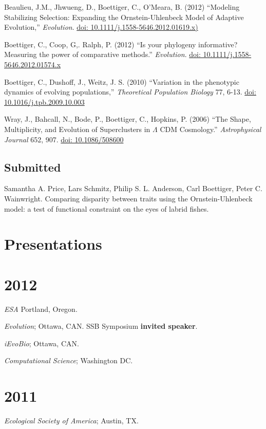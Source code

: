\documentclass[margin]{res}
\begin{document}
\begin{resume}
Beaulieu, J.M., Jhwueng, D., Boettiger, C., O'Meara, B. (2012) ``Modeling Stabilizing Selection: Expanding the Ornstein-Uhlenbeck Model of Adaptive Evolution,'' {\it Evolution}. \href{http://dx.doi.org/10.1111/j.1558-5646.2012.01619.x}{doi: 10.1111/j.1558-5646.2012.01619.x)}

Boettiger, C., Coop, G,. Ralph, P. (2012) ``Is your phylogeny informative? Measuring the power of comparative methods.'' {\it Evolution}. \href{http://dx.doi.org/10.1111/j.1558-5646.2012.01574.x}{doi: 10.1111/j.1558-5646.2012.01574.x}

Boettiger, C., Dushoff, J., Weitz, J. S. (2010) ``Variation in the phenotypic dynamics of evolving populations,'' {\it Theoretical Population Biology} 77, 6-13. \href{http://dx.doi.org/10.1016/j.tpb.2009.10.003}{doi: 10.1016/j.tpb.2009.10.003}

Wray, J., Bahcall, N., Bode, P., Boettiger, C., Hopkins, P.  (2006)  ``The Shape, Multiplicity, and Evolution of Superclusters in $\Lambda$ CDM Cosmology.''  {\it Astrophysical Journal} 652, 907. \href{http://dx.doi.org/10.1086/508600}{doi: 10.1086/508600}

\subsection{Submitted}

Samantha A. Price, Lars Schmitz, Philip S. L. Anderson, Carl Boettiger, Peter C. Wainwright. Comparing disparity between traits using the Ornstein-Uhlenbeck model: a test of functional constraint on the eyes of labrid fishes.

\section{Presentations} 

\section{\textnormal{2012}}
  \emph{ESA} Portland, Oregon.  

  \emph{Evolution}; Ottawa, CAN. SSB Symposium \textbf{invited speaker}.

  \emph{iEvoBio}; Ottawa, CAN. 

  \emph{Computational Science}; Washington DC. 

\section{\textnormal{2011}}
  \emph{Ecological Society of America}; Austin, TX. 


\end{resume}
\end{document}
